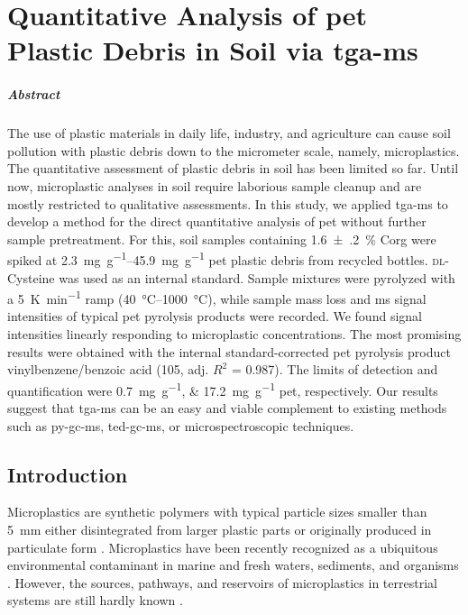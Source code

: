 
\chapter{Quantitative Analysis of \Acs{pet} Plastic Debris in Soil via \Acs{tga-ms}}
\label{ch:tga-ms-method}

\paragraph{Abstract} The use of plastic materials in daily life, industry, and agriculture can cause soil pollution with plastic debris down to the micrometer scale, namely, microplastics.
The quantitative assessment of plastic debris in soil has been limited so far. Until now, microplastic analyses in soil require laborious sample cleanup and are mostly restricted to qualitative assessments. In this study, we applied \ac{tga-ms} to develop a method for the direct quantitative analysis of \ac{pet} without further sample pretreatment.
For this, soil samples containing \SI{1.6(2)}{\percent} \ac{Corg} were spiked at \SIrange{2.3}{45.9}{\milli\gram\per\gram} \ac{pet} plastic debris from recycled bottles. \textsc{dl}-Cysteine was used as an internal standard. Sample mixtures were pyrolyzed with a \SI{5}{\kelvin\per\minute} ramp (\SIrange{40}{1000}{\degreeCelsius}), while sample mass loss and \ac{ms} signal intensities of typical \ac{pet} pyrolysis products were recorded.
We found signal intensities linearly responding to microplastic concentrations. The most promising results were obtained with the internal standard-corrected \ac{pet} pyrolysis product vinylbenzene\slash benzoic acid (\SI{105}{\mz}, adj. $R^2$ = \num{0.987}). The limits of detection and quantification were \SIlist{0.7;17.2}{\milli\gram\per\gram} \ac{pet}, respectively.
Our results suggest that \ac{tga-ms} can be an easy and viable complement to existing methods such as \ac{py-gc-ms}, \ac{ted-gc-ms}, or microspectroscopic techniques.

\section{Introduction}

Microplastics are synthetic polymers with typical particle sizes smaller than \SI{5}{\milli\meter} either disintegrated from larger plastic parts or originally produced in particulate form \citep{CincinelliMicroplastic2017}.
Microplastics have been recently recognized as a ubiquitous environmental contaminant in marine and fresh waters, sediments, and organisms \citep{KarlssonScreening2017,RochmanMicroplastics2018}. However, the sources, pathways, and reservoirs of microplastics in terrestrial systems are still hardly known \citep{DrisSynthetic2016}.

